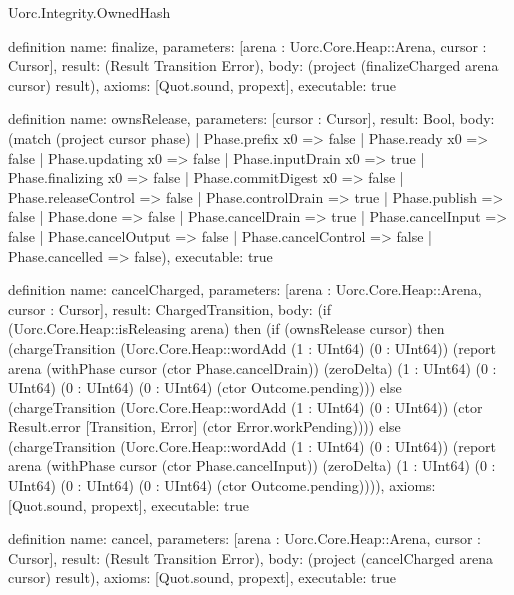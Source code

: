 \begin{lexlean}{Uorc.Integrity.OwnedHash}
\begin{semanticmodule}
definition{
  name: finalize,
  parameters: [arena : Uorc.Core.Heap::Arena, cursor : Cursor],
  result: (Result Transition Error),
  body: (project (finalizeCharged arena cursor) result),
  axioms: [Quot.sound, propext],
  executable: true
}

definition{
  name: ownsRelease,
  parameters: [cursor : Cursor],
  result: Bool,
  body: (match (project cursor phase)
    | Phase.prefix x0 => false
    | Phase.ready x0 => false
    | Phase.updating x0 => false
    | Phase.inputDrain x0 => true
    | Phase.finalizing x0 => false
    | Phase.commitDigest x0 => false
    | Phase.releaseControl => false
    | Phase.controlDrain => true
    | Phase.publish => false
    | Phase.done => false
    | Phase.cancelDrain => true
    | Phase.cancelInput => false
    | Phase.cancelOutput => false
    | Phase.cancelControl => false
    | Phase.cancelled => false),
  executable: true
}

definition{
  name: cancelCharged,
  parameters: [arena : Uorc.Core.Heap::Arena, cursor : Cursor],
  result: ChargedTransition,
  body: (if (Uorc.Core.Heap::isReleasing arena) then (if (ownsRelease cursor) then (chargeTransition (Uorc.Core.Heap::wordAdd (1 : UInt64) (0 : UInt64)) (report arena (withPhase cursor (ctor Phase.cancelDrain)) (zeroDelta) (1 : UInt64) (0 : UInt64) (0 : UInt64) (0 : UInt64) (ctor Outcome.pending))) else (chargeTransition (Uorc.Core.Heap::wordAdd (1 : UInt64) (0 : UInt64)) (ctor Result.error [Transition, Error] (ctor Error.workPending)))) else (chargeTransition (Uorc.Core.Heap::wordAdd (1 : UInt64) (0 : UInt64)) (report arena (withPhase cursor (ctor Phase.cancelInput)) (zeroDelta) (1 : UInt64) (0 : UInt64) (0 : UInt64) (0 : UInt64) (ctor Outcome.pending)))),
  axioms: [Quot.sound, propext],
  executable: true
}

definition{
  name: cancel,
  parameters: [arena : Uorc.Core.Heap::Arena, cursor : Cursor],
  result: (Result Transition Error),
  body: (project (cancelCharged arena cursor) result),
  axioms: [Quot.sound, propext],
  executable: true
}


\end{semanticmodule}
\end{lexlean}
